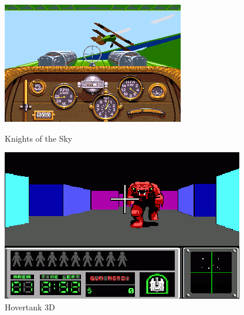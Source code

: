 \documentclass[11pt]{article}
\begin{document}
\begin{figure}
	\begin{minipage}{0.48\textwidth}
		\includegraphics[width=\linewidth]{image/knights-of-the-sky.png}
		\hspace*{-0.5cm}
		\caption{Knights of the Sky}
		\label{fig:knights-of-the-sky}
	\end{minipage}
	\begin{minipage}{0.48\textwidth}
		\centering
		\includegraphics[width=\linewidth]{image/Hovertank_3D.png}
		\hspace*{-0.5cm}
		\caption{Hovertank 3D}
		\label{fig:hovertank3d}
	\end{minipage}
\end{figure}
\end{document}
